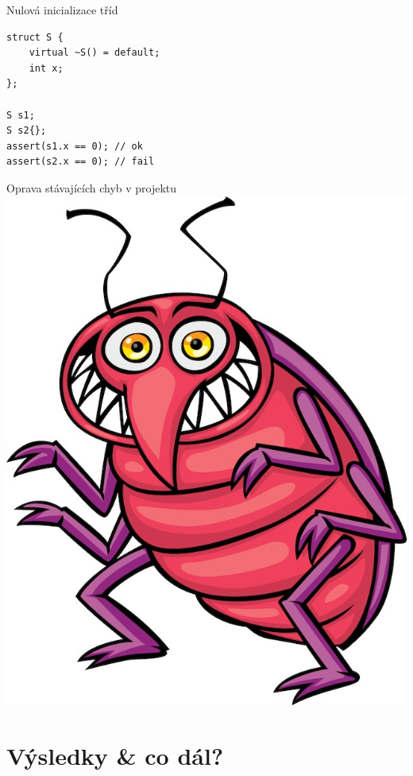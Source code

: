 \documentclass[11pt]{beamer}
\begin{document}

\begin{frame}[fragile]{Nulová inicializace tříd}
\begin{lstlisting}
struct S {
	virtual ~S() = default;
	int x;
};

S s1;
S s2{};
assert(s1.x == 0); // ok
assert(s2.x == 0); // fail
\end{lstlisting}
\end{frame}



\begin{frame}{Oprava stávajících chyb v projektu}
\includegraphics[width=0.5\linewidth]{img/bug.jpg}
\end{frame}

\section{Výsledky \& co dál?}
\end{document}
